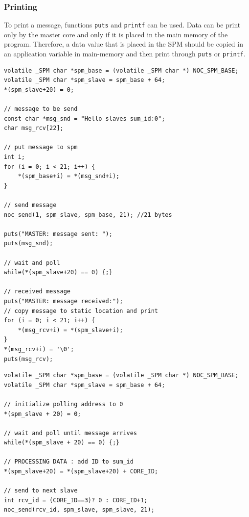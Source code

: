 \documentclass[a4paper,fontsize=10pt,twoside,DIV15,BCOR12mm,headinclude=true,footinclude=false,pagesize,bibtotoc]{scrbook}
\newcommand{\code}[1]{{\texttt{#1}}}
\begin{document}
\subsubsection{Printing}
To print a message, functions \code{puts} and \code{printf} can be used. Data can be print only
by the master core and only if it is placed in the main memory of the program. Therefore,
a data value that is placed in the SPM should be copied in an application variable in main-memory
and then print through \code{puts} or \code{printf}. 



\begin{lstlisting}[float,caption={A 2x2 Hello World application: Master application.\label{lst:hello_master}}]
volatile _SPM char *spm_base = (volatile _SPM char *) NOC_SPM_BASE;
volatile _SPM char *spm_slave = spm_base + 64;
*(spm_slave+20) = 0;

// message to be send
const char *msg_snd = "Hello slaves sum_id:0";
char msg_rcv[22];

// put message to spm
int i;
for (i = 0; i < 21; i++) {
	*(spm_base+i) = *(msg_snd+i);
}

// send message
noc_send(1, spm_slave, spm_base, 21); //21 bytes

puts("MASTER: message sent: ");
puts(msg_snd);

// wait and poll
while(*(spm_slave+20) == 0) {;}

// received message
puts("MASTER: message received:");
// copy message to static location and print
for (i = 0; i < 21; i++) {
	*(msg_rcv+i) = *(spm_slave+i);
}
*(msg_rcv+i) = '\0';
puts(msg_rcv);

\end{lstlisting}




\begin{lstlisting}[float,caption={A 2x2 Hello World application: Slave application.\label{lst:hello_slave}}]
volatile _SPM char *spm_base = (volatile _SPM char *) NOC_SPM_BASE;
volatile _SPM char *spm_slave = spm_base + 64;

// initialize polling address to 0
*(spm_slave + 20) = 0;

// wait and poll until message arrives
while(*(spm_slave + 20) == 0) {;}

// PROCESSING DATA : add ID to sum_id
*(spm_slave+20) = *(spm_slave+20) + CORE_ID;

// send to next slave
int rcv_id = (CORE_ID==3)? 0 : CORE_ID+1;
noc_send(rcv_id, spm_slave, spm_slave, 21);

\end{lstlisting}
\end{document}
